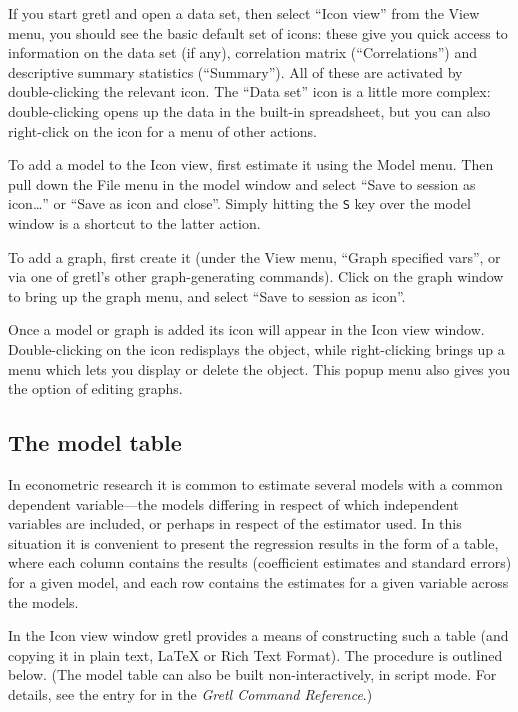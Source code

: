 If you start gretl and open a data set, then select ``Icon
view'' from the View menu, you should see the basic default set of
icons: these give you quick access to information on the data set (if
any), correlation matrix (``Correlations'') and descriptive summary
statistics (``Summary''). All of these are activated by
double-clicking the relevant icon.  The ``Data set'' icon is a little
more complex: double-clicking opens up the data in the built-in
spreadsheet, but you can also right-click on the icon for a menu of
other actions.

To add a model to the Icon view, first estimate it using the Model
menu.  Then pull down the File menu in the model window and select
``Save to session as icon\dots{}'' or ``Save as icon and close''.
Simply hitting the \verb+S+ key over the model window is a shortcut to
the latter action.

To add a graph, first create it (under the View menu, ``Graph
specified vars'', or via one of gretl's other graph-generating
commands).  Click on the graph window to bring up the graph menu, and
select ``Save to session as icon''.

Once a model or graph is added its icon will appear in the Icon view
window.  Double-clicking on the icon redisplays the object, while
right-clicking brings up a menu which lets you display or delete the
object.  This popup menu also gives you the option of editing graphs.

\subsection{The model table}
\label{model-table}

In econometric research it is common to estimate several models with a
common dependent variable---the models differing in respect of which
independent variables are included, or perhaps in respect of the
estimator used.  In this situation it is convenient to present the
regression results in the form of a table, where each column contains
the results (coefficient estimates and standard errors) for a given
model, and each row contains the estimates for a given variable across
the models.

In the Icon view window gretl provides a means of constructing such a
table (and copying it in plain text, {\LaTeX} or Rich Text Format).
The procedure is outlined below.  (The model table can also be built
non-interactively, in script mode.  For details, see the entry for
 in the \emph{Gretl Command Reference}.)

